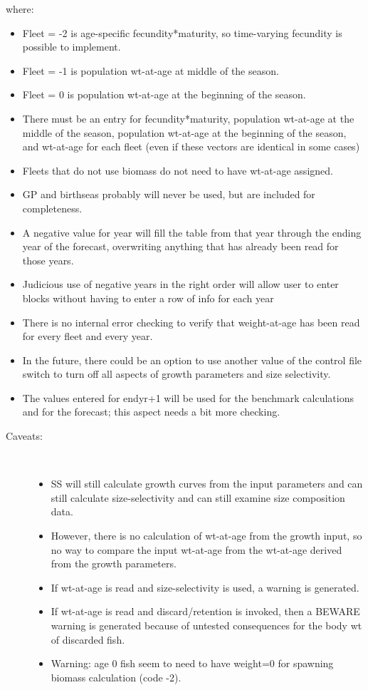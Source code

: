 where:

\begin{itemize}
	\item Fleet = -2 is age-specific fecundity*maturity, so time-varying fecundity is possible to implement.
	\item Fleet = -1 is population wt-at-age at middle of the season.
	\item Fleet = 0 is population wt-at-age at the beginning of the season.
	\item There must be an entry for fecundity*maturity, population wt-at-age at the middle of the season, population wt-at-age at the beginning of the season, and wt-at-age for each fleet (even if these vectors are identical in some cases)
	\item Fleets that do not use biomass do not need to have wt-at-age assigned.
	\item GP and birthseas probably will never be used, but are included for completeness.
	\item A negative value for year will fill the table from that year through the ending year of the forecast, overwriting anything that has already been read for those years.
	\item Judicious use of negative years in the right order will allow user to enter blocks without having to enter a row of info for each year

	\item There is no internal error checking to  verify that weight-at-age has been read for every fleet and every year.
	\item In the future, there could be an option to use another value of the control file switch to turn off all aspects of growth parameters and size selectivity.
	\item The values entered for endyr+1 will be used for the benchmark calculations and for the forecast; this aspect needs a bit more checking.
\end{itemize}

\begin{description}
	\item[Caveats:]\hfill\\
		 \begin{itemize}
			\item SS will still calculate growth curves from the input parameters and can still calculate size-selectivity and can still examine size composition data.
			\item However, there is no calculation of wt-at-age from the growth input, so no way to compare the input wt-at-age from the wt-at-age derived from the growth parameters.
			\item If wt-at-age is read and size-selectivity is used, a warning is generated.
			\item If wt-at-age is read and discard/retention is invoked, then a BEWARE warning is generated because of untested consequences for the body wt of discarded fish.
			\item Warning:  age 0 fish seem to need to have weight=0 for spawning biomass calculation (code -2).
		\end{itemize}
\end{description}

